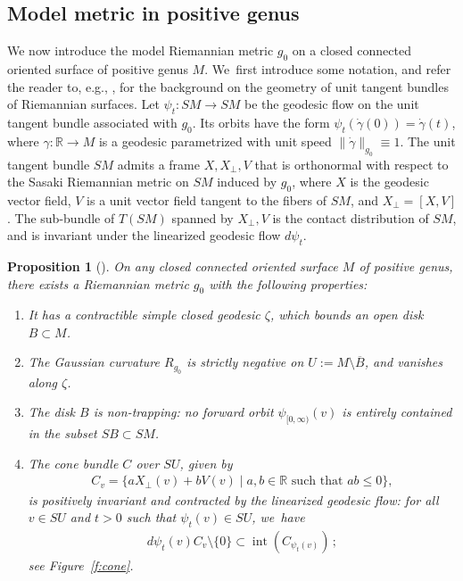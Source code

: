 \documentclass[JEP,XML,SOM,Unicode,NoFloatCountersInSection,published]{cedram}
\let\sep\mid
\newcommand{\R}{\mathbb{R}}
\DeclareMathOperator{\interior}{int}
\theoremstyle{plain}
\newtheorem{Prop}[Thm]{Proposition}
\theoremstyle{definition}
\begin{document}
\subsection{Model metric in positive genus}
We now introduce the model Riemannian metric $g_0$ on a closed connected oriented surface of positive genus $M$. We~first introduce some notation, and refer the reader to, e.g., \cite[\S1.11]{Guillarmou:2024aa}, for the background on the geometry of unit tangent bundles of Riemannian surfaces.
Let $\psi_t:SM\to SM$ be the geodesic flow on the unit tangent bundle associated with $g_0$. Its orbits have the form $\psi_t(\dot\gamma(0))=\dot\gamma(t)$, where $\gamma:\R\to M$ is a geodesic parametrized with unit speed $\|\dot\gamma\|_{g_0}\equiv1$. The unit tangent bundle $SM$ admits a frame $X,X_\perp,V$ that is orthonormal with respect to the Sasaki Riemannian metric on $SM$ induced by $g_0$, where $X$ is the geodesic vector field, $V$ is a unit vector field tangent to the fibers of $SM$, and $X_\perp=[X,V]$. The sub-bundle of $T(SM)$ spanned by $X_\perp,V$ is the contact distribution of $SM$, and is invariant under the linearized geodesic flow $d\psi_t$.

\begin{Prop}[\cite{Donnay:1988ab,Burns:1989aa}]
\label{p:model_metric_positive_genus}
On any closed connected oriented surface $M$ of positive genus, there exists a Riemannian metric $g_0$ with the following properties:
\begin{enumerate}
\item\label{p:model_metric_positive_genusi}
It has a contractible simple closed geodesic $\zeta$, which bounds an open disk $B\subset M$.

\item\label{p:model_metric_positive_genusii}
The Gaussian curvature $R_{g_0}$ is strictly negative on $U:=M\setminus\overline B$, and vanishes along $\zeta$.

\item\label{p:model_metric_positive_genusiii}
The disk $B$ is non-trapping: no forward orbit $\psi_{[0,\infty)}(v)$ is entirely contained in the subset $SB\subset SM$.

\item\label{p:model_metric_positive_genusiv}
The cone bundle $C$ over $SU$, given by
\begin{align}
\label{e:cone_field}
C_v
=
\big\{
aX_\perp(v) + b V(v)\sep
a,b\in\R\mbox{ such that }ab\leq0
\big\},
\end{align}
is positively invariant and contracted by the linearized geodesic flow: for all $v\in SU$ and $t>0$ such that $\psi_t(v)\in SU$, we~have
\begin{align*}
d\psi_t(v)C_v\setminus\{0\}\subset \interior(C_{\psi_t(v)})\,;
\end{align*}
see Figure~\ref{f:cone}.
\end{enumerate}
\end{Prop}
\end{document}
